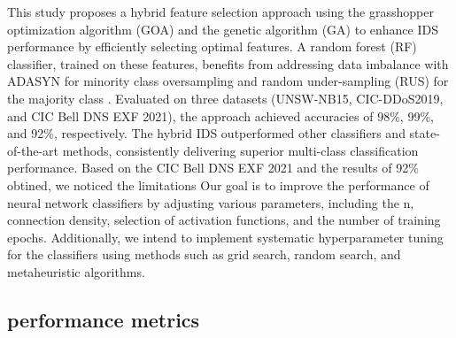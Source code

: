  This study proposes a hybrid feature selection approach using the grasshopper optimization algorithm (GOA) and the genetic algorithm (GA) to enhance IDS performance by efficiently selecting optimal features. A random forest (RF) classifier, trained on these features, benefits from addressing data imbalance with ADASYN for minority class oversampling and random under-sampling (RUS) for the majority class \cite{cloud_ids2021}. Evaluated on three datasets (UNSW-NB15, CIC-DDoS2019, and CIC Bell DNS EXF 2021), the approach achieved accuracies of 98\%, 99\%, and 92\%, respectively. The hybrid IDS outperformed other classifiers and state-of-the-art methods, consistently delivering superior multi-class classification performance.
Based on the CIC Bell DNS EXF 2021 and the results of 92\% obtined, we noticed the limitations Our goal is to improve the performance of neural network classifiers by adjusting various parameters, including the n, connection density, selection of activation functions, and the number of training epochs. Additionally, we intend to implement systematic hyperparameter tuning for the classifiers using methods such as grid search, random search, and metaheuristic algorithms.
\subsection{performance metrics}
